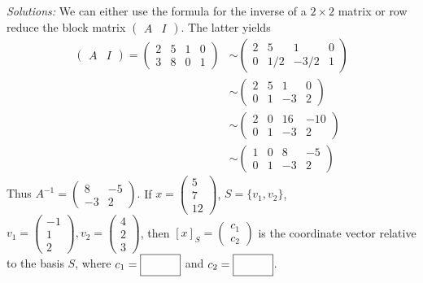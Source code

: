     \ifnum {} {\color{DarkBlue} \textit{Solutions:} We can either use the formula for the inverse of a $2\times 2 $ matrix or row reduce the block matrix $\begin{pmatrix} A & I\end{pmatrix}$. The latter yields
    \begin{align}
        \begin{pmatrix} A & I\end{pmatrix} 
        = \begin{pmatrix} 2&5&1&0\\3&8&0&1\end{pmatrix} 
        &\sim \begin{pmatrix} 2&5&1&0\\0&1/2&-3/2&1\end{pmatrix}\\
        &\sim \begin{pmatrix} 2&5&1&0\\0&1&-3&2\end{pmatrix}\\
        &\sim \begin{pmatrix} 2&0&16&-10\\0&1&-3&2\end{pmatrix}\\
        &\sim \begin{pmatrix} 1&0&8&-5\\0&1&-3&2\end{pmatrix}
    \end{align}
    Thus $A^{-1} =\begin{pmatrix} 8&-5\\-3&2\end{pmatrix}$. 
    } 
    \fi        
\fi 
\ifnum {}
    If $x = \begin{pmatrix} 5\\7\\12\end{pmatrix}$, $S=\{v_1,v_2\}$, $v_1=\begin{pmatrix} -1\\1\\2\end{pmatrix}, v_2 = \begin{pmatrix} 4\\2\\3\end{pmatrix}$, then $[x]_S = \begin{pmatrix} c_1\\c_2\end{pmatrix}$ is the coordinate vector relative to the basis $S$, where $c_1 = \framebox{\strut\hspace{1cm}}$ and $c_2 = \framebox{\strut\hspace{1cm}}$. 
